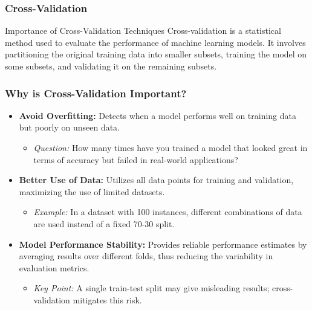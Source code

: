 \documentclass[aspectratio=169]{beamer}
\begin{document}
\begin{frame}[fragile]
    \frametitle{Cross-Validation}
    \begin{block}{Importance of Cross-Validation Techniques}
        Cross-validation is a statistical method used to evaluate the performance of machine learning models. It involves partitioning the original training data into smaller subsets, training the model on some subsets, and validating it on the remaining subsets.
    \end{block}
\end{frame}

\begin{frame}[fragile]
    \frametitle{Why is Cross-Validation Important?}
    \begin{itemize}
        \item \textbf{Avoid Overfitting:} Detects when a model performs well on training data but poorly on unseen data.
        \begin{itemize}
            \item \textit{Question:} How many times have you trained a model that looked great in terms of accuracy but failed in real-world applications?
        \end{itemize}
        
        \item \textbf{Better Use of Data:} Utilizes all data points for training and validation, maximizing the use of limited datasets.
        \begin{itemize}
            \item \textit{Example:} In a dataset with 100 instances, different combinations of data are used instead of a fixed 70-30 split.
        \end{itemize}
        
        \item \textbf{Model Performance Stability:} Provides reliable performance estimates by averaging results over different folds, thus reducing the variability in evaluation metrics.
        \begin{itemize}
            \item \textit{Key Point:} A single train-test split may give misleading results; cross-validation mitigates this risk.
        \end{itemize}
    \end{itemize}
\end{frame}
\end{document}
